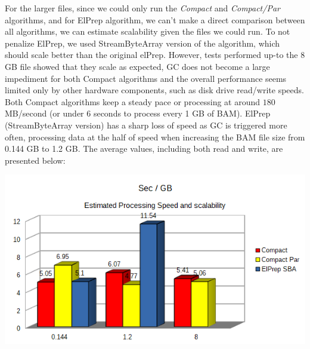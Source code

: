 \documentclass[a4paper,twoside]{article}
\begin{document}
For the larger files, since we could only run the {\it Compact} and {\it Compact/Par} algorithms, and for ElPrep algorithm, we can't make a direct comparison between all algorithms, we can estimate scalability given the files we could run. To not penalize ElPrep, we used StreamByteArray 
version of the algorithm, which should scale better than the original elPrep.  However, tests performed up-to the $8$ GB file showed that they scale as expected, GC does not become a large impediment for both Compact algorithms and the overall performance seems limited only by other hardware components, such as disk drive read/write speeds.
Both Compact algorithms keep a steady pace or processing at around $180$ MB/second (or under 6 seconds to process every 1 GB of BAM). ElPrep (StreamByteArray version) has a sharp loss of speed as GC is triggered more often, processing data at the half of speed when increasing the BAM file size from 0.144 GB to 1.2 GB.
The average values, including both read and write, are presented below:

\begin{center}
	\includegraphics[scale=0.5]{images/seconds_per_gb_ryzen.png}
\end{center}
\end{document}
